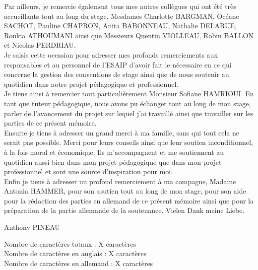 \documentclass[a4paper, 12pt, french]{article}
\begin{document}
	Par ailleurs, je remercie également tous mes autres collègues qui ont été très accueillants tout au long du stage, Mesdames Charlotte BARGMAN, Océane SACHOT, Pauline CHAPRON, Anita BABONNEAU, Nathalie DELARUE, Roukia ATHOUMANI ainsi que Messieurs Quentin VIOLLEAU, Robin BALLON et Nicolas PERDRIAU.\\

	Je saisis cette occasion pour adresser mes profonds remerciements aux responsables et au personnel de l’ESAIP d’avoir fait le nécessaire en ce qui concerne la gestion des conventions de stage ainsi que de nous soutenir au quotidien dans notre projet pédagogique et professionnel.\\

	Je tiens ainsi à remercier tout particulièrement Monsieur Sofiane HAMRIOUI. En tant que tuteur pédagogique, nous avons pu échanger tout au long de mon stage, parler de l’avancement du projet sur lequel j'ai travaillé ainsi que travailler sur les parties de ce présent mémoire.\\

	Ensuite je tiens à adresser un grand merci à ma famille, sans qui tout cela ne serait pas possible. Merci pour leurs conseils ainsi que leur soutien inconditionnel, à la fois moral et économique. Ils m’accompagnent et me soutiennent au quotidien aussi bien dans mon projet pédagogique que dans mon projet professionnel et sont une source d’inspiration pour moi.\\

	Enfin je tiens à adresser un profond remerciement à ma compagne, Madame Antonia HAMMER, pour son soutien tout au long de mon stage, pour son aide pour la rédaction des parties en allemand de ce présent mémoire ainsi que pour la préparation de la partie allemande de la soutenance. Vielen Dank meine Liebe.

\vspace{\baselineskip}\vspace{\baselineskip}\vspace{\baselineskip}
\noindent
Anthony PINEAU

	\newpage

	\normalsize
	
	\doublespacing
	\tableofcontents

	\vspace{\baselineskip}
	\noindent Nombre de caractères totaux : X caractères\\
	Nombre de caractères en anglais : X caractères\\
	Nombre de caractères en allemand : X caractères\\
\end{document}
